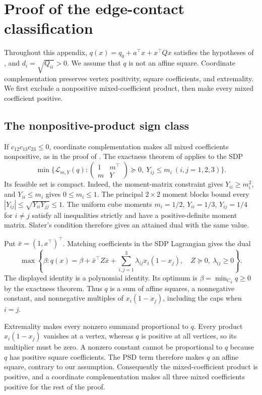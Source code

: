\section{Proof of the edge-contact classification}
\label{app:three:edge-classification}

Throughout this appendix, $q(x)=q_0+a^\top x+x^\top Qx$ satisfies the
hypotheses of , and $d_i=\sqrt{Q_{ii}}>0$.
We assume that $q$ is not an affine square. Coordinate complementation
preserves vertex positivity, square coefficients, and extremality. We first
exclude a nonpositive mixed-coefficient product, then make every mixed
coefficient positive.

\subsection{The nonpositive-product sign class}

If $c_{12}c_{13}c_{23}\le0$, coordinate complementation makes all mixed
coefficients nonpositive, as in the proof of . The
exactness theorem of \citet[Theorem~1]{BurerNatarajanWillemsen2025} applies
to the SDP
\[
 \min\{\mathcal L_{m,Y}(q):
     \begin{pmatrix}1&m^\top\\m&Y\end{pmatrix}\succeq0,
     \ Y_{ij}\le m_i\ (i,j=1,2,3)\}.
\]
Its feasible set is compact. Indeed, the moment-matrix constraint gives
$Y_{ii}\ge m_i^2$, and $Y_{ii}\le m_i$ gives $0\le m_i\le1$.
The principal $2\times2$ moment blocks bound every
$|Y_{ij}|\le\sqrt{Y_{ii}Y_{jj}}\le1$. The uniform cube moments
$m_i=1/2$, $Y_{ii}=1/3$, $Y_{ij}=1/4$ for $i\ne j$ satisfy all inequalities
strictly and have a positive-definite moment matrix. Slater's condition
therefore gives an attained dual with the same value.

Put $\bar x=(1,x^\top)^\top$. Matching coefficients in the SDP
Lagrangian gives the dual
\[
 \max\left\{\beta:
 q(x)=\beta+\bar x^\top Z\bar x
             +\sum_{i,j=1}^3\lambda_{ij}x_i(1-x_j),\quad
 Z\succeq0,\ \lambda_{ij}\ge0\right\}.
\]
The displayed identity is a polynomial identity. Its optimum is
$\beta=\min_{C_3}q\ge0$ by the exactness theorem. Thus $q$ is a sum of
affine squares, a nonnegative constant, and nonnegative multiples of
$x_i(1-x_j)$, including the caps when $i=j$.

Extremality makes every nonzero summand proportional to $q$. Every product
$x_i(1-x_j)$ vanishes at a vertex, whereas $q$ is positive at all vertices,
so its multiplier must be zero. A nonzero constant cannot be proportional
to $q$ because $q$ has positive square coefficients. The PSD term therefore
makes $q$ an affine square, contrary to our assumption. Consequently the
mixed-coefficient product is positive, and a coordinate complementation
makes all three mixed coefficients positive for the rest of the proof.

